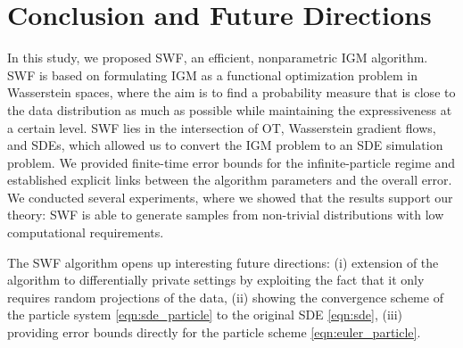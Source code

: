 
\section{Conclusion and Future Directions}

In this study, we proposed SWF, an efficient, nonparametric IGM algorithm.
SWF is based on formulating IGM as a functional optimization problem in Wasserstein spaces, where the aim is to find a probability measure that is close to the data distribution as much as possible while maintaining the expressiveness at a certain level.
SWF lies in the intersection of OT, Wasserstein gradient flows, and SDEs, which allowed us to convert the IGM problem to an SDE simulation problem. We provided finite-time error bounds for the infinite-particle regime and established explicit links between the algorithm parameters and the overall error.
%
We conducted several experiments, where we showed that the results support our theory: SWF is able to generate samples from non-trivial distributions with low computational requirements.

The SWF algorithm opens up interesting future directions: (i) extension of the algorithm to differentially private settings \cite{dwork2014algorithmic} by exploiting the fact that it only requires random projections of the data, (ii) showing the convergence scheme of the particle system \eqref{eqn:sde_particle} to the original SDE \eqref{eqn:sde}, (iii) providing error bounds directly for the particle scheme \eqref{eqn:euler_particle}.
